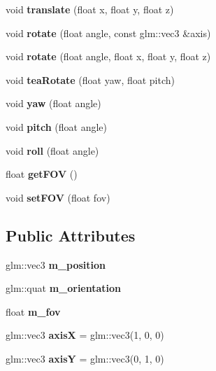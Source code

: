 \begin{DoxyCompactItemize}
void {\bfseries translate} (float x, float y, float z)
\item 
\mbox{\label{class_camera_a0e6180b5a8da63a999db3de1802c8f4c}} 
void {\bfseries rotate} (float angle, const glm\+::vec3 \&axis)
\item 
\mbox{\label{class_camera_a4a45040f06f24a53af7f17bbcc610f22}} 
void {\bfseries rotate} (float angle, float x, float y, float z)
\item 
\mbox{\label{class_camera_ac09690e0b8fa927653dc5881a1cf7c7f}} 
void {\bfseries tea\+Rotate} (float yaw, float pitch)
\item 
\mbox{\label{class_camera_ab4eab94754431725c572d528a07a35cc}} 
void {\bfseries yaw} (float angle)
\item 
\mbox{\label{class_camera_a49e00b90b94853e4485a6bdf063796de}} 
void {\bfseries pitch} (float angle)
\item 
\mbox{\label{class_camera_a72be99f88b1cc21122178109d3441818}} 
void {\bfseries roll} (float angle)
\item 
\mbox{\label{class_camera_a5ec1871e6f296d8528e64157c6371c09}} 
float {\bfseries get\+F\+OV} ()
\item 
\mbox{\label{class_camera_ade53ee61895c2143da3cec03d08ef3eb}} 
void {\bfseries set\+F\+OV} (float fov)
\end{DoxyCompactItemize}
\subsection*{Public Attributes}
\begin{DoxyCompactItemize}
\item 
\mbox{\label{class_camera_aa4d06d49524248f81823444fa2544da0}} 
glm\+::vec3 {\bfseries m\+\_\+position}
\item 
\mbox{\label{class_camera_ac035d6cb4b4bae255d6d12f51137357e}} 
glm\+::quat {\bfseries m\+\_\+orientation}
\item 
\mbox{\label{class_camera_aa404a4e057fa16fb82ce8668d7a661b6}} 
float {\bfseries m\+\_\+fov}
\item 
\mbox{\label{class_camera_a77b356053ed77c2df065d03130b94a97}} 
glm\+::vec3 {\bfseries axisX} = glm\+::vec3(1, 0, 0)
\item 
\mbox{\label{class_camera_a7522f086d341b41c3cae18edd8571097}} 
glm\+::vec3 {\bfseries axisY} = glm\+::vec3(0, 1, 0)
\end{DoxyCompactItemize}


